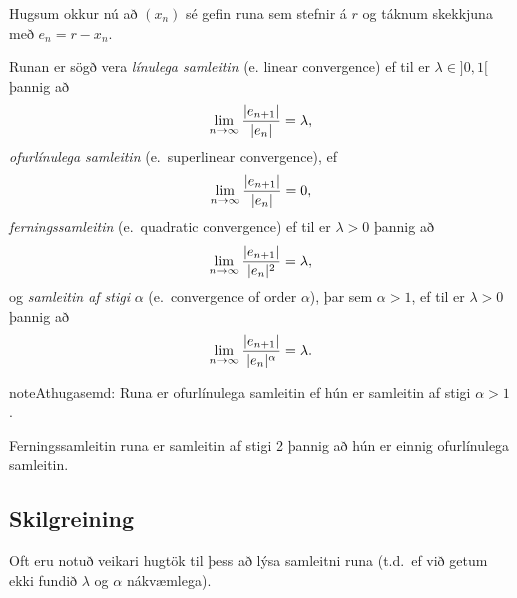 \documentclass[letterpaper,10pt,icelandic]{sphinxmanual}
\begin{document}
Hugsum okkur nú að \((x_n)\) sé gefin runa sem stefnir á \(r\)
og táknum skekkjuna með \(e_n=r-x_n\).

Runan er sögð vera \emph{línulega samleitin} (e. linear convergence) ef til
er \(\lambda\in ]0,1[\) þannig að
\begin{gather}
\begin{split}\lim_{n\to \infty}\dfrac{|e_{n+1}|}{|e_n|}=\lambda,\end{split}\notag
\end{gather}
\emph{ofurlínulega samleitin} (e. superlinear convergence), ef
\begin{gather}
\begin{split}\lim_{n\to \infty}\dfrac{|e_{n+1}|}{|e_n|}=0,\end{split}\notag
\end{gather}
\emph{ferningssamleitin} (e. quadratic convergence) ef til er \(\lambda>0\) þannig að
\begin{gather}
\begin{split}\lim_{n\to \infty}\dfrac{|e_{n+1}|}{|e_n|^2}=\lambda,\end{split}\notag
\end{gather}
og \emph{samleitin af stigi} \(\alpha\) (e. convergence of order
\(\alpha\)), þar sem \(\alpha> 1\), ef til er \(\lambda>0\)
þannig að
\begin{gather}
\begin{split}\lim_{n\to \infty}\dfrac{|e_{n+1}|}{|e_n|^\alpha}=\lambda.\end{split}\notag
\end{gather}
\begin{notice}{note}{Athugasemd:}
Runa er ofurlínulega samleitin ef hún er samleitin af stigi \(\alpha>1\).

Ferningssamleitin runa er samleitin af stigi 2 þannig að hún er einnig ofurlínulega samleitin.
\end{notice}


\subsection{Skilgreining}
\label{kafli01:skilgreining}
Oft eru notuð veikari hugtök til þess að lýsa samleitni runa (t.d. ef
við getum ekki fundið \(\lambda\) og \(\alpha\) nákvæmlega).
\end{document}

